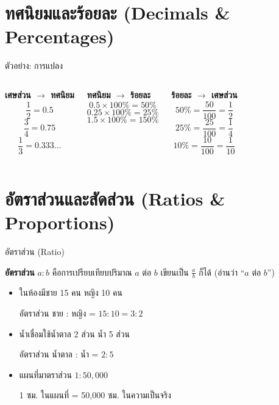 \documentclass[11pt, aspectratio=169]{beamer}
\begin{document}
\section{ทศนิยมและร้อยละ (Decimals \& Percentages)}

\begin{frame}{ตัวอย่าง: การแปลง}
  \begin{columns}[T]
      \centering
      \textbf{เศษส่วน $\to$ ทศนิยม}
      \[
        \frac{1}{2} = 0.5
      \]
      \[
        \frac{3}{4} = 0.75
      \]
      \[
        \frac{1}{3} = 0.333\ldots
      \]

      \centering
      \textbf{ทศนิยม $\to$ ร้อยละ}
      \[
        0.5 \times 100\% = 50\%
      \]
      \[
        0.25 \times 100\% = 25\%
      \]
      \[
        1.5 \times 100\% = 150\%
      \]

      \centering
      \textbf{ร้อยละ $\to$ เศษส่วน}
      \[
        50\% = \frac{50}{100} = \frac{1}{2}
      \]
      \[
        25\% = \frac{25}{100} = \frac{1}{4}
      \]
      \[
        10\% = \frac{10}{100} = \frac{1}{10}
      \]
  \end{columns}
\end{frame}

\section{อัตราส่วนและสัดส่วน (Ratios \& Proportions)}

\begin{frame}{อัตราส่วน (Ratio)}
  \begin{explanation}[นิยาม]
    \textbf{อัตราส่วน} $a : b$ คือการเปรียบเทียบปริมาณ $a$ ต่อ $b$
    เขียนเป็น $\frac{a}{b}$ ก็ได้ (อ่านว่า ``$a$ ต่อ $b$'')
  \end{explanation}

  \begin{exambox}[ตัวอย่าง]
    \begin{itemize}
      \item ในห้องมีชาย 15 คน หญิง 10 คน
      \par อัตราส่วน ชาย : หญิง = $15 : 10 = 3 : 2$
      \item นํ้าเชื่อมใช้นํ้าตาล 2 ส่วน นํ้า 5 ส่วน
      \par อัตราส่วน นํ้าตาล : นํ้า = $2 : 5$
      \item แผนที่มาตราส่วน $1 : 50{,}000$
      \par 1 ซม. ในแผนที่ = 50,000 ซม. ในความเป็นจริง
    \end{itemize}
  \end{exambox}
\end{frame}
\end{document}

